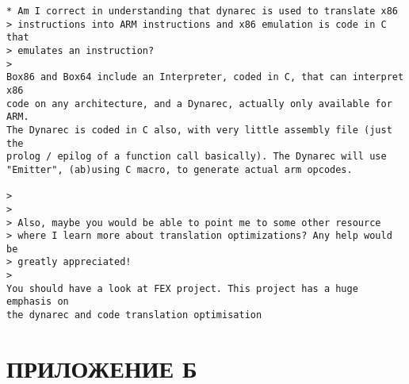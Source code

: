 \begin{Verbatim}[fontsize=\footnotesize]
* Am I correct in understanding that dynarec is used to translate x86
> instructions into ARM instructions and x86 emulation is code in C that
> emulates an instruction?
>
Box86 and Box64 include an Interpreter, coded in C, that can interpret x86
code on any architecture, and a Dynarec, actually only available for ARM.
The Dynarec is coded in C also, with very little assembly file (just the
prolog / epilog of a function call basically). The Dynarec will use
"Emitter", (ab)using C macro, to generate actual arm opcodes.

>
>
> Also, maybe you would be able to point me to some other resource
> where I learn more about translation optimizations? Any help would be
> greatly appreciated!
>
You should have a look at FEX project. This project has a huge emphasis on
the dynarec and code translation optimisation
\end{Verbatim}

\pagebreak

\section*{ПРИЛОЖЕНИЕ Б}

